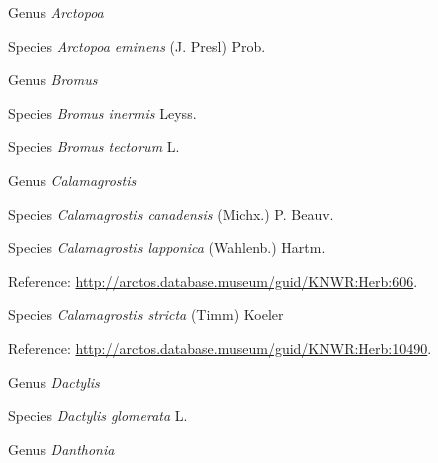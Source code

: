 \documentclass[9pt, article]{memoir}
\begin{document}
\begin{multicols}{2}
\vspace{6pt}\noindent\hspace{30pt}Genus \textit{Arctopoa}


\vspace{6pt}\noindent\hspace{36pt}Species \textit{Arctopoa eminens} (J. Presl) Prob.


\vspace{6pt}\noindent\hspace{30pt}Genus \textit{Bromus}


\vspace{6pt}\noindent\hspace{36pt}Species \textit{Bromus inermis} Leyss.


\vspace{6pt}\noindent\hspace{36pt}Species \textit{Bromus tectorum} L.


\vspace{6pt}\noindent\hspace{30pt}Genus \textit{Calamagrostis}


\vspace{6pt}\noindent\hspace{36pt}Species \textit{Calamagrostis canadensis} (Michx.) P. Beauv.


\vspace{6pt}\noindent\hspace{36pt}Species \textit{Calamagrostis lapponica} (Wahlenb.) Hartm.


\vspace{6pt}Reference: 
\url{http://arctos.database.museum/guid/KNWR:Herb:606}.

\vspace{6pt}\noindent\hspace{36pt}Species \textit{Calamagrostis stricta} (Timm) Koeler


\vspace{6pt}Reference: 
\url{http://arctos.database.museum/guid/KNWR:Herb:10490}.

\vspace{6pt}\noindent\hspace{30pt}Genus \textit{Dactylis}


\vspace{6pt}\noindent\hspace{36pt}Species \textit{Dactylis glomerata} L.


\vspace{6pt}\noindent\hspace{30pt}Genus \textit{Danthonia}



\end{multicols}
\end{document}
